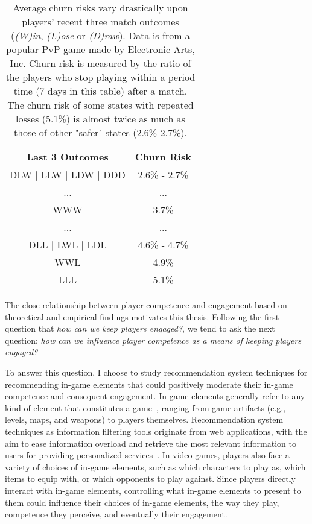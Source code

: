 \begin{table}
\centering
\caption{
Average churn risks vary drastically upon players' recent three match outcomes (\emph{(W)in}, \emph{(L)ose} or \emph{(D)raw}). Data is from a popular PvP game made by Electronic Arts, Inc. Churn risk is measured by the ratio of the players who stop playing within a period time (7 days in this table) after a match. The churn risk of some states with repeated losses (5.1\%) is almost twice as much as those of other "safer" states (2.6\%-2.7\%).
} \label{tab:churnrate}
\vspace{2mm}
\begin{tabular}{|c|c|}
\hline
Last 3 Outcomes & Churn Risk                      \\ \hline
DLW $|$ LLW $|$ LDW $|$ DDD      &  2.6\% - 2.7\%        \\
... & ...  \\
WWW   &  3.7\% \\
... & ... \\
DLL $|$ LWL $|$ LDL  &  4.6\% - 4.7\%  \\
WWL & 4.9\% \\
LLL & 5.1\% \\
\hline
\end{tabular}
\end{table}

The close relationship between player competence and engagement based on theoretical and empirical findings motivates this thesis. Following the first question that \textit{how can we keep players engaged?}, we tend to ask the next question: \textit{how can we influence player competence as a means of keeping players engaged?}

To answer this question, I choose to study recommendation system techniques \cite{medler2011using} for recommending in-game elements that could positively moderate their in-game competence and consequent engagement. In-game elements generally refer to any kind of element that constitutes a game~\cite{ralph2015toward,fullerton2008game}, ranging from game artifacts (e.g., levels, maps, and weapons) to players themselves. Recommendation system techniques as information filtering tools originate from web applications, with the aim to ease information overload and retrieve the most relevant information to users for providing personalized services~\cite{isinkaye2015recommendation,bobadilla2013recommender,resnick1997recommender,adomavicius2005toward}. In video games, players also face a variety of choices of in-game elements, such as which characters to play as, which items to equip with, or which opponents to play against. Since players directly interact with in-game elements, controlling what in-game elements to present to them could influence their choices of in-game elements, the way they play, competence they perceive, and eventually their engagement. 


